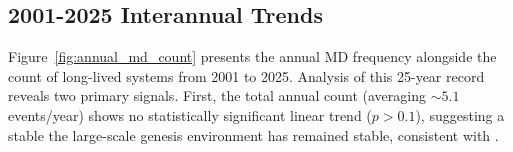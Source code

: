 %
%
\subsection{2001-2025 Interannual Trends}
\label{subsec:interannual}

Figure~\ref{fig:annual_md_count} presents the annual MD frequency
alongside the count of long-lived systems from 2001 to 2025. Analysis
of this 25-year record reveals two primary signals. First, the total
annual count (averaging $\sim 5.1$ events/year) shows no
statistically significant linear trend ($p > 0.1$), suggesting a
stable the large-scale genesis environment has remained stable,
consistent with \citet{mishra2021monsoon}.


